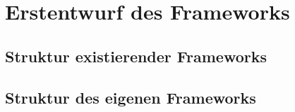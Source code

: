 \chapter{Erstentwurf des Frameworks}

\section{Struktur existierender Frameworks}

\section{Struktur des eigenen Frameworks}